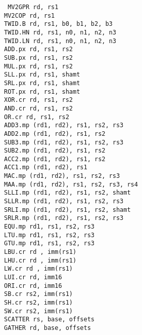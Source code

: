 {\tt
MV2GPR  rd, rs1                 \\
MV2COP  rd, rs1                 \\
TWID.B  rd, rs1, b0, b1, b2, b3 \\
TWID.HN rd, rs1, n0, n1, n2, n3 \\
TWID.LN rd, rs1, n0, n1, n2, n3 \\
ADD.px  rd, rs1, rs2            \\
SUB.px  rd, rs1, rs2            \\
MUL.px  rd, rs1, rs2            \\
SLL.px  rd, rs1, shamt          \\
SRL.px  rd, rs1, shamt          \\
ROT.px  rd, rs1, shamt          \\
XOR.cr  rd, rs1, rs2            \\
AND.cr  rd, rs1, rs2            \\
OR.cr   rd, rs1, rs2            \\
ADD3.mp (rd1, rd2),  rs1, rs2, rs3 \\
ADD2.mp (rd1, rd2),  rs1, rs2  \\
SUB3.mp (rd1, rd2),  rs1, rs2, rs3 \\
SUB2.mp (rd1, rd2),  rs1, rs2  \\
ACC2.mp (rd1, rd2),  rs1, rs2  \\
ACC1.mp (rd1, rd2),  rs1       \\
MAC.mp  (rd1, rd2),  rs1, rs2, rs3 \\
MAA.mp  (rd1, rd2),  rs1, rs2, rs3, rs4 \\
SLLI.mp (rd1, rd2),  rs1, rs2, shamt \\
SLLR.mp (rd1, rd2),  rs1, rs2, rs3 \\
SRLI.mp (rd1, rd2),  rs1, rs2, shamt \\
SRLR.mp (rd1, rd2),  rs1, rs2, rs3 \\
EQU.mp  rd1,         rs1, rs2, rs3 \\
LTU.mp  rd1,         rs1, rs2, rs3 \\
GTU.mp  rd1,         rs1, rs2, rs3 \\
LBU.cr  rd , imm(rs1)           \\
LHU.cr  rd , imm(rs1)           \\
LW.cr   rd , imm(rs1)           \\
LUI.cr  rd,  imm16              \\
ORI.cr  rd,  imm16              \\
SB.cr   rs2, imm(rs1)           \\
SH.cr   rs2, imm(rs1)           \\
SW.cr   rs2, imm(rs1)           \\
SCATTER rs, base, offsets       \\
GATHER  rd, base, offsets       \\
}


